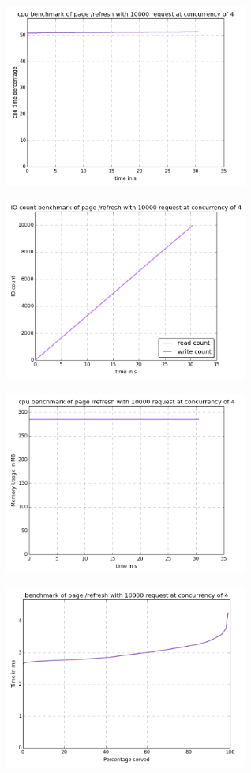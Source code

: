 \begin{center}
\includegraphics[width=0.6\textwidth]{img/refresh.cpu.png}



\includegraphics[width=0.6\textwidth]{img/refresh.io-count.png}



\includegraphics[width=0.6\textwidth]{img/refresh.mem.png}



\includegraphics[width=0.6\textwidth]{img/refresh.serv-time.png}




\end{center}

